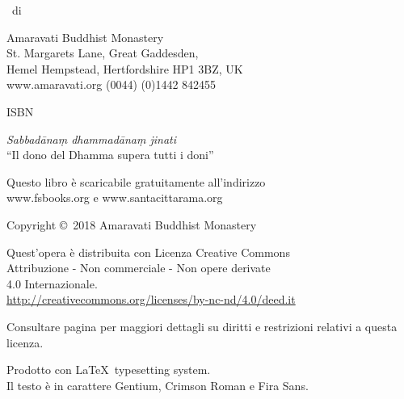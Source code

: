 \cleartoverso
\thispagestyle{empty}

\vspace*{-3\baselineskip}

{\fontsize{9}{10}\selectfont
\centering
\setlength{\parindent}{0pt}%
\setlength{\parskip}{0.8\baselineskip}%

\thetitle\ di \theauthor

Amaravati Buddhist Monastery\\
St. Margarets Lane, Great Gaddesden,\\
Hemel Hempstead, Hertfordshire HP1 3BZ, UK\\
www.amaravati.org (0044) (0)1442 842455

ISBN \theISBN

\emph{Sabbadānaṃ dhammadānaṃ jinati}\\
``Il dono del Dhamma supera tutti i doni''

Questo libro è scaricabile gratuitamente all'indirizzo\\
www.fsbooks.org e www.santacittarama.org

Copyright \copyright\ 2018 Amaravati Buddhist Monastery

\vfill

{\footnotesize
Quest'opera è distribuita con Licenza Creative Commons\\
Attribuzione - Non commerciale - Non opere derivate\\
4.0 Internazionale.\\
\href{http://creativecommons.org/licenses/by-nc-nd/4.0/deed.it}{http://creativecommons.org/licenses/by-nc-nd/4.0/deed.it}

Consultare pagina \pageref{copyright-details} per maggiori dettagli su diritti e restrizioni relativi a questa licenza.

Prodotto con \LaTeX\ typesetting system.\\
Il testo è in carattere Gentium, Crimson Roman e Fira Sans.

\theEditionInfo

}}
